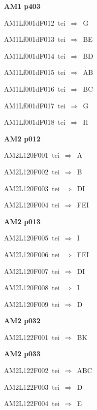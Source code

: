 \par\vfill\eject
{\bf\hfill AM1 p403\hfill\hbox{}}\par\bigskip
{\sixrm AM1Lf001dF012\ {\sixit tei}\ }$\Rightarrow$\ G\par\smallskip
{\sixrm AM1Lf001dF013\ {\sixit tei}\ }$\Rightarrow$\ BE\par\smallskip
{\sixrm AM1Lf001dF014\ {\sixit tei}\ }$\Rightarrow$\ BD\par\smallskip
{\sixrm AM1Lf001dF015\ {\sixit tei}\ }$\Rightarrow$\ AB\par\smallskip
{\sixrm AM1Lf001dF016\ {\sixit tei}\ }$\Rightarrow$\ BC\par\smallskip
{\sixrm AM1Lf001dF017\ {\sixit tei}\ }$\Rightarrow$\ G\par\smallskip
{\sixrm AM1Lf001dF018\ {\sixit tei}\ }$\Rightarrow$\ H\par\smallskip

\par\vfill\eject
{\bf\hfill AM2 p012\hfill\hbox{}}\par\bigskip
{\sixrm AM2L120F001\ {\sixit tei}\ }$\Rightarrow$\ A\par\smallskip
{\sixrm AM2L120F002\ {\sixit tei}\ }$\Rightarrow$\ B\par\smallskip
{\sixrm AM2L120F003\ {\sixit tei}\ }$\Rightarrow$\ DI\par\smallskip
{\sixrm AM2L120F004\ {\sixit tei}\ }$\Rightarrow$\ FEI\par\smallskip

\par\vfill\eject
{\bf\hfill AM2 p013\hfill\hbox{}}\par\bigskip
{\sixrm AM2L120F005\ {\sixit tei}\ }$\Rightarrow$\ I\par\smallskip
{\sixrm AM2L120F006\ {\sixit tei}\ }$\Rightarrow$\ FEI\par\smallskip
{\sixrm AM2L120F007\ {\sixit tei}\ }$\Rightarrow$\ DI\par\smallskip
{\sixrm AM2L120F008\ {\sixit tei}\ }$\Rightarrow$\ I\par\smallskip
{\sixrm AM2L120F009\ {\sixit tei}\ }$\Rightarrow$\ D\par\smallskip

\par\vfill\eject
{\bf\hfill AM2 p032\hfill\hbox{}}\par\bigskip
{\sixrm AM2L122F001\ {\sixit tei}\ }$\Rightarrow$\ BK\par\smallskip

\par\vfill\eject
{\bf\hfill AM2 p033\hfill\hbox{}}\par\bigskip
{\sixrm AM2L122F002\ {\sixit tei}\ }$\Rightarrow$\ ABC\par\smallskip
{\sixrm AM2L122F003\ {\sixit tei}\ }$\Rightarrow$\ D\par\smallskip
{\sixrm AM2L122F004\ {\sixit tei}\ }$\Rightarrow$\ E\par\smallskip


